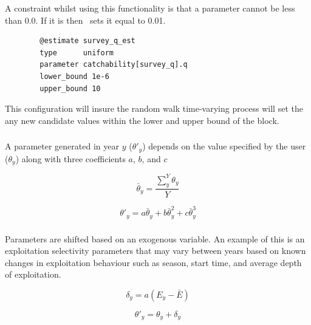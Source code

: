 A constraint whilst using this functionality is that a parameter cannot be less than 0.0. If it is then \CNAME\ sets it equal to 0.01.

{\small{\begin{verbatim}
		@estimate survey_q_est
		type      uniform
		parameter catchability[survey_q].q
		lower_bound 1e-6
		upper_bound 10
		\end{verbatim}}}

This configuration will insure the random walk time-varying process will set the any new candidate values within the lower and upper bound of the  block.


\subsubsection[Annual shift]{} \label{sec:TimeVarying-AnnualShift}

A parameter generated in year $y$ ($\theta'_y$) depends on the value specified by the user ($\theta_y$) along with three coefficients $a$, $b$, and $c$

\begin{equation}
\bar{\theta}_y = \frac{\sum_{y}^Y\theta_y}{Y}
\end{equation}

\begin{equation}
\theta'_y = a \bar{\theta}_y + b\bar{\theta}_y^{2} + c\bar{\theta}_y^{3}
\end{equation}

\subsubsection[Exogenous]{}\label{sec:TimeVarying-Exogenous}

Parameters are shifted based on an exogenous variable. An example of this is an exploitation selectivity parameters that may vary between years based on known changes in exploitation behaviour such as season, start time, and average depth of exploitation.

\begin{equation}
\delta_y = a(E_y - \bar{E})
\end{equation}

\begin{equation}
\theta'_y = \theta_y + \delta_y
\end{equation}

